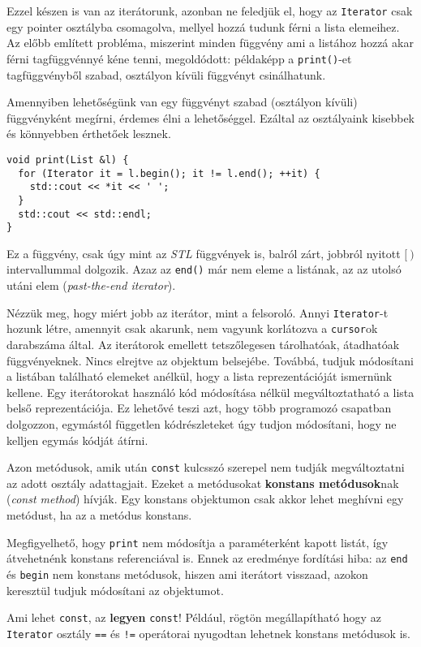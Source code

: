 \documentclass[../cpp_book/cpp_book.tex]{subfiles}
\begin{document}
	\smallskip
	Ezzel készen is van az iterátorunk, azonban ne feledjük el, hogy az \texttt{Iterator} csak egy pointer osztályba csomagolva, mellyel hozzá tudunk férni a lista elemeihez. Az előbb említett probléma, miszerint minden függvény ami a listához hozzá akar férni tagfüggvénnyé kéne tenni, megoldódott: példaképp a \texttt{print()}-et tagfüggvényből szabad, osztályon kívüli függvényt csinálhatunk.
 	
 	Amennyiben lehetőségünk van egy függvényt szabad (osztályon kívüli) függvényként megírni, érdemes élni a lehetőséggel. Ezáltal az osztályaink kisebbek és könnyebben érthetőek lesznek.
	\begin{lstlisting}
void print(List &l) {
  for (Iterator it = l.begin(); it != l.end(); ++it) {
    std::cout << *it << ' ';
  }
  std::cout << std::endl;
}
	\end{lstlisting}
	Ez a függvény, csak úgy mint az \textit{STL} függvények is, balról zárt, jobbról nyitott $[\ )$ intervallummal dolgozik. Azaz az \texttt{end()} már nem eleme a listának, az az utolsó {utáni} elem (\textit{past-the-end iterator}).
	
	\medskip
	Nézzük meg, hogy miért jobb az iterátor, mint a felsoroló. Annyi \texttt{Iterator}-t hozunk létre, amennyit csak akarunk, nem vagyunk korlátozva a \texttt{cursor}ok darabszáma által. Az iterátorok emellett tetszőlegesen tárolhatóak, átadhatóak függvényeknek. Nincs elrejtve az objektum belsejébe. Továbbá, tudjuk módosítani a listában található elemeket anélkül, hogy a lista reprezentációját ismernünk kellene. Egy iterátorokat használó kód módosítása nélkül megváltoztatható a lista belső reprezentációja. Ez lehetővé teszi azt, hogy több programozó csapatban dolgozzon, egymástól független kódrészleteket úgy tudjon módosítani, hogy ne kelljen egymás kódját átírni.
	
	\medskip
	Azon metódusok, amik után \texttt{const} kulcsszó szerepel nem tudják megváltoztatni az adott osztály adattagjait. Ezeket a metódusokat \textbf{konstans metódusok}nak (\textit{const method}) hívják. Egy konstans objektumon csak akkor lehet meghívni egy metódust, ha az a metódus konstans.
	
	\medskip
	Megfigyelhető, hogy \texttt{print} nem módosítja a paraméterként kapott listát, így átvehetnénk konstans referenciával is. Ennek az eredménye fordítási hiba: az \texttt{end} és \texttt{begin} nem konstans metódusok, hiszen ami iterátort visszaad, azokon keresztül tudjuk módosítani az objektumot.
	\begin{note}
		Ami lehet \texttt{const}, az \textbf{legyen} \texttt{const}! Például, rögtön megállapítható hogy az \texttt{Iterator} osztály \texttt{==} és \texttt{!=} operátorai nyugodtan lehetnek konstans metódusok is.
	\end{note}
\end{document}
